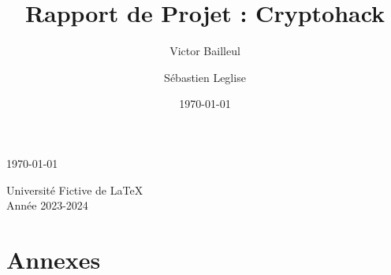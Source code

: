 \documentclass[12pt, a4paper]{article}
\title{Rapport de Projet : Cryptohack}
\author{Victor Bailleul \and Sébastien Leglise}
\date{\today}
\begin{document}
\begin{titlepage}
    \centering %

    \vspace*{1cm} %
    \begin{figure}[h!]
        \centering
        
    \end{figure}
    \vspace{2cm} %

    {\Huge\bfseries \thetitle\par}
    \vspace{1.5cm} %

    {\Large \theauthor\par}
    \vspace{1cm} %

    {\large \today\par}

    \vfill %

    {\large Université Fictive de LaTeX\\ Année 2023-2024\par}
    \vspace{1cm} %

\end{titlepage}


    \setcounter{page}{1}  %

    \tableofcontents %

    \clearpage

    
    
    
    
    
    

    \appendix
    \newpage
    \section*{Annexes}

    
\end{document}
